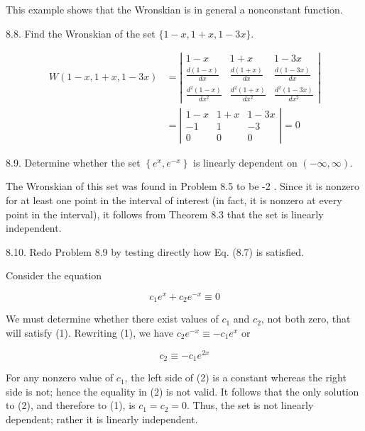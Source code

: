 \documentclass[10pt]{article}
\begin{document}
This example shows that the Wronskian is in general a nonconstant function.

8.8. Find the Wronskian of the set $\{1-x, 1+x, 1-3 x\}$.

$$
\begin{aligned}
W(1-x, 1+x, 1-3 x) & =\left|\begin{array}{ccc}
1-x & 1+x & 1-3 x \\
\frac{d(1-x)}{d x} & \frac{d(1+x)}{d x} & \frac{d(1-3 x)}{d x} \\
\frac{d^{2}(1-x)}{d x^{2}} & \frac{d^{2}(1+x)}{d x^{2}} & \frac{d^{2}(1-3 x)}{d x^{2}}
\end{array}\right| \\
& =\left|\begin{array}{ccc}
1-x & 1+x & 1-3 x \\
-1 & 1 & -3 \\
0 & 0 & 0
\end{array}\right|=0
\end{aligned}
$$

8.9. Determine whether the set $\left\{e^{x}, e^{-x}\right\}$ is linearly dependent on $(-\infty, \infty)$.

The Wronskian of this set was found in Problem 8.5 to be -2 . Since it is nonzero for at least one point in the interval of interest (in fact, it is nonzero at every point in the interval), it follows from Theorem 8.3 that the set is linearly independent.

8.10. Redo Problem 8.9 by testing directly how Eq. (8.7) is satisfied.

Consider the equation


\begin{equation*}
c_{1} e^{x}+c_{2} e^{-x} \equiv 0 \tag{1}
\end{equation*}


We must determine whether there exist values of $c_{1}$ and $c_{2}$, not both zero, that will satisfy (1). Rewriting (1), we have $c_{2} e^{-x} \equiv-c_{1} e^{x}$ or


\begin{equation*}
c_{2} \equiv-c_{1} e^{2 x} \tag{2}
\end{equation*}


For any nonzero value of $c_{1}$, the left side of (2) is a constant whereas the right side is not; hence the equality in (2) is not valid. It follows that the only solution to (2), and therefore to (1), is $c_{1}=c_{2}=0$. Thus, the set is not linearly dependent; rather it is linearly independent.
\end{document}
